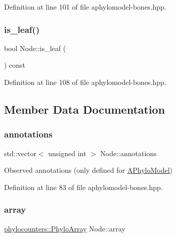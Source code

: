Definition at line 101 of file aphylomodel-\/bones.\+hpp.

\mbox{\label{class_node_af7cc2d0f435e3bee4388a0e9ab42adb8}} 
\subsubsection{\texorpdfstring{is\+\_\+leaf()}{is\_leaf()}}
{\footnotesize\ttfamily bool Node\+::is\+\_\+leaf (\begin{DoxyParamCaption}{ }\end{DoxyParamCaption}) const\hspace{0.3cm}{\ttfamily [inline]}}



Definition at line 108 of file aphylomodel-\/bones.\+hpp.



\subsection{Member Data Documentation}
\mbox{\label{class_node_aea43a76094980788d1debd3e18ed8070}} 
\subsubsection{\texorpdfstring{annotations}{annotations}}
{\footnotesize\ttfamily std\+::vector$<$ unsigned int $>$ Node\+::annotations}



Observed annotations (only defined for \hyperlink{class_a_phylo_model}{A\+Phylo\+Model}) 



Definition at line 83 of file aphylomodel-\/bones.\+hpp.

\mbox{\label{class_node_a86d6575dd1ad7ab0cb02c6e6202b0608}} 
\subsubsection{\texorpdfstring{array}{array}}
{\footnotesize\ttfamily \hyperlink{namespacebarry_1_1counters_1_1phylo_abd293bf65e494e903639fb5fb2c91604}{phylocounters\+::\+Phylo\+Array} Node\+::array}



